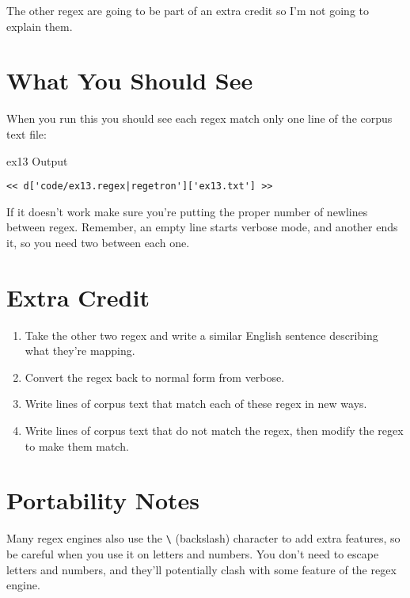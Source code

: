 The other regex are going to be part of an extra credit so I'm not going to
explain them.

\section{What You Should See}

When you run this you should see each regex match only one line of the corpus
text file:

\begin{code}{ex13 Output}
\begin{Verbatim}
<< d['code/ex13.regex|regetron']['ex13.txt'] >>
\end{Verbatim}
\end{code}

If it doesn't work make sure you're putting the proper number of newlines between
regex.  Remember, an empty line starts verbose mode, and another ends it, so you
need two between each one.

\section{Extra Credit}

\begin{enumerate}
\item Take the other two regex and write a similar English sentence describing what
    they're mapping.
\item Convert the regex back to normal form from verbose.
\item Write lines of corpus text that match each of these regex in new ways.
\item Write lines of corpus text that do not match the regex, then modify the
    regex to make them match.
\end{enumerate}

\section{Portability Notes}

Many regex engines also use the \verb|\| (backslash) character to add extra
features, so be careful when you use it on letters and numbers.  You don't
need to escape letters and numbers, and they'll potentially clash with some
feature of the regex engine.
